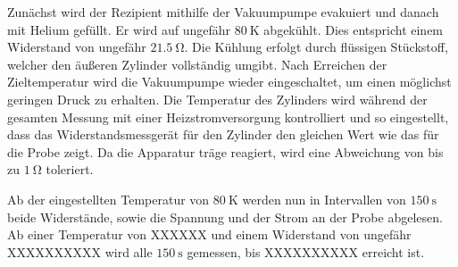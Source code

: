 Zunächst wird der Rezipient mithilfe der Vakuumpumpe evakuiert und danach mit Helium gefüllt. Er wird auf ungefähr $\SI{80}{\kelvin}$ abgekühlt. Dies entspricht einem Widerstand von ungefähr $\SI{21.5}{\ohm}$. Die Kühlung erfolgt durch flüssigen Stückstoff, welcher den äußeren Zylinder vollständig umgibt. Nach Erreichen der Zieltemperatur wird die Vakuumpumpe wieder eingeschaltet, um einen möglichst geringen Druck zu erhalten. Die Temperatur des Zylinders wird während der gesamten Messung mit einer Heizstromversorgung kontrolliert und so eingestellt, dass das Widerstandsmessgerät für den Zylinder den gleichen Wert wie das für die Probe zeigt. Da die Apparatur träge reagiert, wird eine Abweichung von bis zu $\SI{1}{\ohm}$ toleriert.

Ab der eingestellten Temperatur von $\SI{80}{\kelvin}$ werden nun in Intervallen von $\SI{150}{\second}$ beide Widerstände, sowie die Spannung und der Strom an der Probe abgelesen. Ab einer Temperatur von XXXXXX und einem Widerstand von ungefähr XXXXXXXXXX wird alle $\SI{150}{\second}$ gemessen, bis XXXXXXXXXX erreicht ist.
